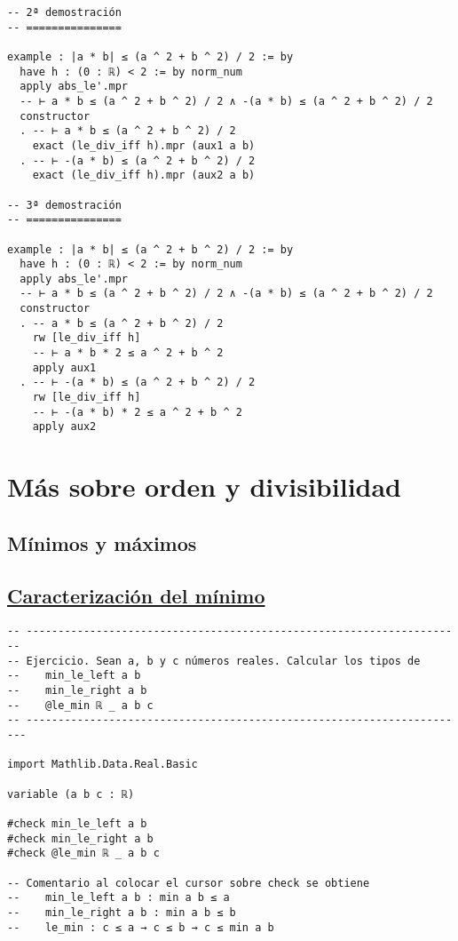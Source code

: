\begin{verbatim}
-- 2ª demostración
-- ===============

example : |a * b| ≤ (a ^ 2 + b ^ 2) / 2 := by
  have h : (0 : ℝ) < 2 := by norm_num
  apply abs_le'.mpr
  -- ⊢ a * b ≤ (a ^ 2 + b ^ 2) / 2 ∧ -(a * b) ≤ (a ^ 2 + b ^ 2) / 2
  constructor
  . -- ⊢ a * b ≤ (a ^ 2 + b ^ 2) / 2
    exact (le_div_iff h).mpr (aux1 a b)
  . -- ⊢ -(a * b) ≤ (a ^ 2 + b ^ 2) / 2
    exact (le_div_iff h).mpr (aux2 a b)

-- 3ª demostración
-- ===============

example : |a * b| ≤ (a ^ 2 + b ^ 2) / 2 := by
  have h : (0 : ℝ) < 2 := by norm_num
  apply abs_le'.mpr
  -- ⊢ a * b ≤ (a ^ 2 + b ^ 2) / 2 ∧ -(a * b) ≤ (a ^ 2 + b ^ 2) / 2
  constructor
  . -- a * b ≤ (a ^ 2 + b ^ 2) / 2
    rw [le_div_iff h]
    -- ⊢ a * b * 2 ≤ a ^ 2 + b ^ 2
    apply aux1
  . -- ⊢ -(a * b) ≤ (a ^ 2 + b ^ 2) / 2
    rw [le_div_iff h]
    -- ⊢ -(a * b) * 2 ≤ a ^ 2 + b ^ 2
    apply aux2
\end{verbatim}

\section{Más sobre orden y divisibilidad}
\label{sec:org4d1689e}

\subsection{Mínimos y máximos}
\label{sec:org16ebafc}

\subsection{\href{./src/Basicos/Caracterizacion\_del\_minimo.lean}{Caracterización del mínimo}}
\label{sec:orgfbfc73c}
\begin{verbatim}
-- ---------------------------------------------------------------------
-- Ejercicio. Sean a, b y c números reales. Calcular los tipos de
--    min_le_left a b
--    min_le_right a b
--    @le_min ℝ _ a b c
-- ----------------------------------------------------------------------

import Mathlib.Data.Real.Basic

variable (a b c : ℝ)

#check min_le_left a b
#check min_le_right a b
#check @le_min ℝ _ a b c

-- Comentario al colocar el cursor sobre check se obtiene
--    min_le_left a b : min a b ≤ a
--    min_le_right a b : min a b ≤ b
--    le_min : c ≤ a → c ≤ b → c ≤ min a b
\end{verbatim}

